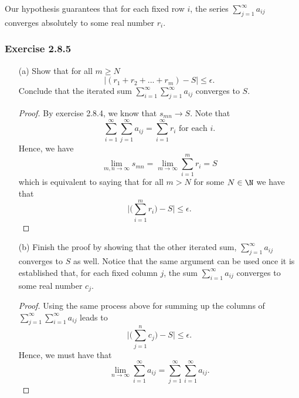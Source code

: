 \begin{enumerate}
        Our hypothesis guarantees that for each fixed row \( i \), the series \( \sum_{ j=1 }^{ \infty  } a_{ij} \) converges absolutely to some real number \( r_i  \). 

        \subsubsection{Exercise 2.8.5}
        \begin{enumerate}
            \item[(a)] Show that for all \( m \geq N \) 
                \[ | (r_1 + r_2 + ... + r_m) - S  | \leq \epsilon. \]
                Conclude that the iterated sum \( \sum_{ i=1 }^{ \infty  } \sum_{ j=1 }^{ \infty  } a_{ij} \) converges to \( S \). 
                \begin{proof}
                    By exercise 2.8.4, we know that \( s_{mn} \to S  \). Note that 
                    \[  \sum_{ i=1 }^{ \infty   } \sum_{ j=1 }^{ \infty   } a_{ij} = \sum_{ i=1 }^{ \infty   } r_i \text{ for each } i.\]
                    Hence, we have 
                    \[ \lim_{ m,n \to \infty  } s_{mn} = \lim_{ m \to \infty  } \sum_{ i=1 }^{ m }r_i = S  \]
                    which is equivalent to saying that for all \( m > N  \) for some \( N \in \N  \) we have that 
                    \[  \Big| \Big( \sum_{ i=1 }^{ m } r_i \Big) - S \Big| \leq \epsilon.    \]
                \end{proof}
            \item[(b)] Finish the proof by showing that the other iterated sum, \( \sum_{ j=1 }^{ \infty  } a_{ij} \) converges to \( S \) as well. Notice that the same argument can be used once it is established that, for each fixed column \( j \), the sum \( \sum_{ i=1 }^{ \infty  } a_{ij} \) converges to some real number \( c_j \). 
                \begin{proof}
                    Using the same process above for summing up the columns of \( \sum_{ j=1 }^{ \infty  } \sum_{ i =1  }^{ \infty  } a_{ij} \) leads to 
                    \[ \Big| \Big( \sum_{ j=1 }^{ n  } c_j \Big) - S \Big| \leq  \epsilon.  \]
                    Hence, we must have that 
                    \[  \lim_{ n \to \infty  } \sum_{ i=1 }^{ \infty  } a_{ij} = \sum_{ j=1 }^{ \infty  } \sum_{ i =1 }^{ \infty  } a_{ij}. \]
                \end{proof}
        \end{enumerate}

\end{enumerate}

